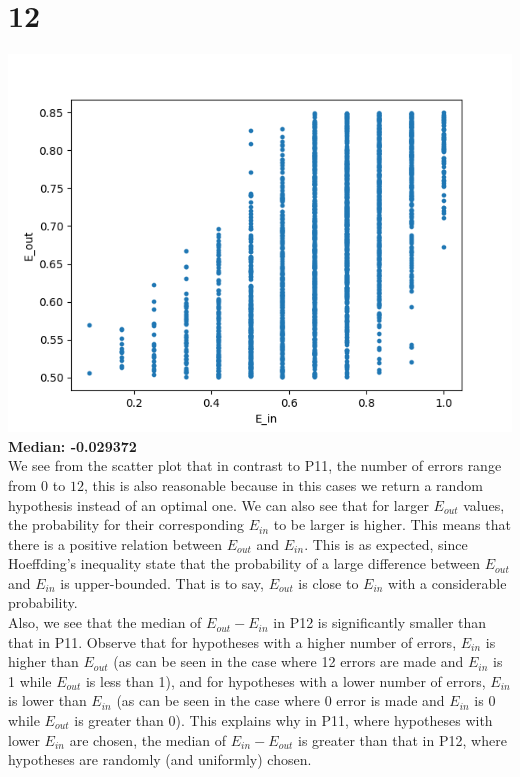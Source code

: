 \documentclass[11pt]{article}
\theoremstyle{definition}
\begin{document}
\section*{12}
\includegraphics{P12_2.png} \\
\textbf{Median: -0.029372} \\
We see from the scatter plot that in contrast to P11, the number of errors range from $0$ to $12$, this is also reasonable because in this cases we return a random hypothesis instead of an optimal one. We can also see that for larger $E_{out}$ values, the probability for their corresponding $E_{in}$ to be larger is higher. This means that there is a positive relation between $E_{out}$ and $E_{in}$. This is as expected, since Hoeffding's inequality state that the probability of a large difference between $E_{out}$ and $E_{in}$ is upper-bounded. That is to say, $E_{out}$ is close to $E_{in}$ with a considerable probability. \\
Also, we see that the median of $E_{out} - E_{in}$ in P12 is significantly smaller than that in P11. Observe that for hypotheses with a higher number of errors, $E_{in}$ is higher than $E_{out}$ (as can be seen in the case where 12 errors are made and $E_{in}$ is 1 while $E_{out}$ is less than 1), and for hypotheses with a lower number of errors, $E_{in}$ is lower than $E_{in}$ (as can be seen in the case where 0 error is made and $E_{in}$ is 0 while $E_{out}$ is greater than 0). This explains why in P11, where hypotheses with lower $E_{in}$ are chosen, the median of $E_{in} - E_{out}$ is greater than that in P12, where hypotheses are randomly (and uniformly) chosen.  \\
\end{document}
